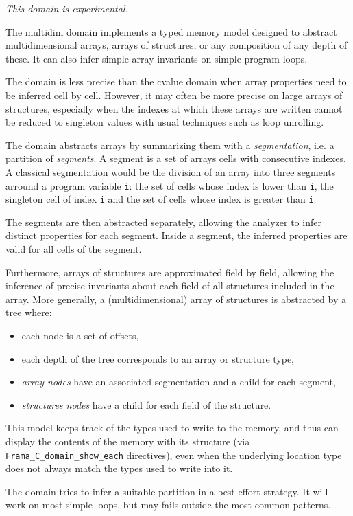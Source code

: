 \documentclass{frama-c-book}
\begin{document}
\emph{This domain is experimental.}

The multidim domain implements a typed memory model designed to abstract
multidimensional arrays, arrays of structures, or any composition of any depth
of these. It can also infer simple array invariants on simple program loops.

The domain is less precise than the cvalue domain when array properties need
to be inferred cell by cell.
However, it may often be more precise on large arrays of structures, especially
when the indexes at which these arrays are written cannot be
reduced to singleton values with usual techniques such as loop unrolling.

The domain abstracts arrays by summarizing them with a {\it segmentation}, i.e. a
partition of {\it segments}. A segment is a set of arrays cells with consecutive
indexes. A classical segmentation would be the division of an array into three
segments arround a program variable {\tt i}: the set of cells whose index is
lower than {\tt i}, the singleton cell of index {\tt i} and the set of cells
whose index is greater than {\tt i}.


The segments are then abstracted separately, allowing the analyzer to infer
distinct properties for each segment. Inside a segment, the inferred
properties are valid for all cells of the segment.

Furthermore, arrays of structures are approximated field by field, allowing the
inference of precise invariants about each field of all structures included in
the array. More generally, a (multidimensional) array of structures is
abstracted by a tree where:
\begin{itemize}
  \item each node is a set of offsets,
  \item each depth of the tree corresponds to an array or structure type,
  \item {\it array nodes} have an associated segmentation and a child for
        each segment,
  \item {\it structures nodes} have a child for each field of the structure.
\end{itemize}

This model keeps track of the types used to write to the memory, and thus
can display the contents of the memory with its structure (via
\lstinline|Frama_C_domain_show_each| directives), even when the underlying
location type does not always match the types used to write into it.

The domain tries to infer a suitable partition in a best-effort strategy. It
will work on most simple loops, but may fails outside the most common patterns.
\end{document}

